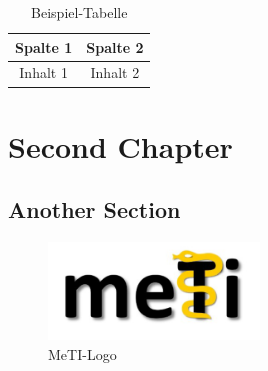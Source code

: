 	\begin{table}[h]
		\centering
		\begin{tabular}{|c|c|}
			\hline
			Spalte 1 & Spalte 2 \\
			\hline
			Inhalt 1 & Inhalt 2 \\
			\hline
		\end{tabular}
		\caption{Beispiel-Tabelle}
		\label{tab:example}
	\end{table}

	\chapter{Second Chapter}

	\section{Another Section}

	\begin{figure}[h]
		\centering
		\includegraphics[width=0.5\textwidth]{HSRTReport/Assets/Images/METI.png}
		\caption{MeTI-Logo}
		\label{fig:meti}
	\end{figure}

\fi
